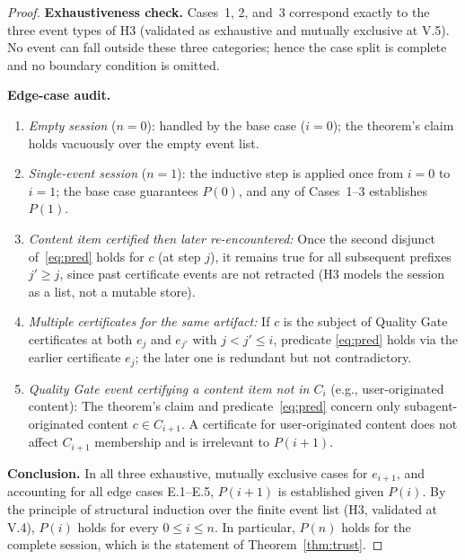 \documentclass[12pt]{article}
\theoremstyle{definition}
\begin{document}
\begin{proof}
\medskip
\noindent\textbf{Exhaustiveness check.}  Cases~1, 2, and~3 correspond
exactly to the three event types of H3 (validated as exhaustive and
mutually exclusive at V.5).  No event can fall outside these three
categories; hence the case split is complete and no boundary condition
is omitted.

\medskip
\noindent\textbf{Edge-case audit.}
\begin{enumerate}
    \item[E.1] \emph{Empty session} ($n = 0$): handled by the base case
               ($i = 0$); the theorem's claim holds vacuously over the
               empty event list.
    \item[E.2] \emph{Single-event session} ($n = 1$): the inductive step
               is applied once from $i=0$ to $i=1$; the base case
               guarantees $P(0)$, and any of Cases~1--3 establishes
               $P(1)$.
    \item[E.3] \emph{Content item certified then later re-encountered:}
               Once the second disjunct of~\eqref{eq:pred} holds for $c$
               (at step $j$), it remains true for all subsequent prefixes
               $j' \geq j$, since past certificate events are not
               retracted (H3 models the session as a list, not a mutable
               store).
    \item[E.4] \emph{Multiple certificates for the same artifact:}
               If $c$ is the subject of Quality Gate certificates at both
               $e_j$ and $e_{j'}$ with $j < j' \leq i$, predicate
               \eqref{eq:pred} holds via the earlier certificate $e_j$;
               the later one is redundant but not contradictory.
    \item[E.5] \emph{Quality Gate event certifying a content item not
               in $C_i$} (e.g., user-originated content):
               The theorem's claim and predicate~\eqref{eq:pred} concern
               only subagent-originated content $c \in C_{i+1}$.
               A certificate for user-originated content does not affect
               $C_{i+1}$ membership and is irrelevant to $P(i+1)$.
\end{enumerate}

\medskip
\noindent\textbf{Conclusion.}  In all three exhaustive, mutually exclusive
cases for $e_{i+1}$, and accounting for all edge cases E.1--E.5, $P(i+1)$
is established given $P(i)$.  By the principle of structural induction over
the finite event list (H3, validated at V.4), $P(i)$ holds for every
$0 \leq i \leq n$.  In particular, $P(n)$ holds for the complete session,
which is the statement of Theorem~\ref{thm:trust}.
\end{proof}
\end{document}
